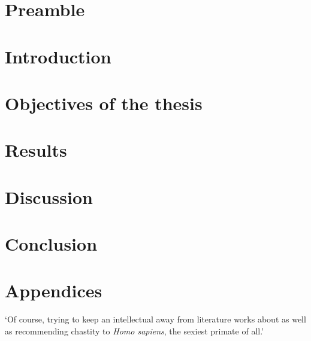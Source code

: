 \documentclass[a4paper,twoside]{ociamthesis}
\begin{document}
\flushbottom
\part*{Preamble}

\part{Introduction}
\label{part:introduction}




\part{Objectives of the thesis}
\label{part:objectives}

\part{Results}
\label{part:results}




\part{Discussion}
\label{part:discussion}


\part*{Conclusion}




\cleardoublepage{}
\startappendices
\part*{Appendices}






\setlength{\baselineskip}{0pt} %

\renewcommand{\bibname}{References}

\begin{savequote}[8cm]

	‘Of course, trying to keep an intellectual away from literature works about as well as recommending chastity to \textit{Homo sapiens}, the sexiest primate of all.’
\end{savequote}



\end{document}
